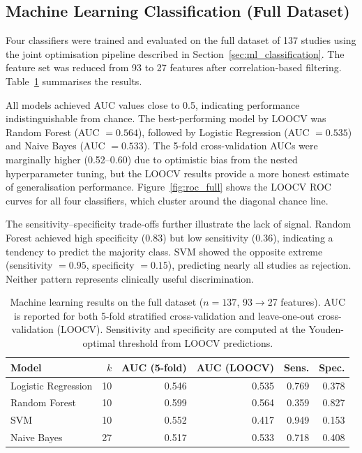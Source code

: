 \begin{appendices}
\section{Machine Learning Classification (Full Dataset)}

Four classifiers were trained and evaluated on the full dataset of 137 studies using the joint optimisation pipeline described in Section~\ref{sec:ml_classification}. The feature set was reduced from 93 to 27 features after correlation-based filtering. Table~\ref{tab:ml_full} summarises the results.

All models achieved AUC values close to 0.5, indicating performance indistinguishable from chance. The best-performing model by LOOCV was Random Forest (AUC $= 0.564$), followed by Logistic Regression (AUC $= 0.535$) and Naive Bayes (AUC $= 0.533$). The 5-fold cross-validation AUCs were marginally higher (0.52--0.60) due to optimistic bias from the nested hyperparameter tuning, but the LOOCV results provide a more honest estimate of generalisation performance. Figure~\ref{fig:roc_full} shows the LOOCV ROC curves for all four classifiers, which cluster around the diagonal chance line.

The sensitivity--specificity trade-offs further illustrate the lack of signal. Random Forest achieved high specificity (0.83) but low sensitivity (0.36), indicating a tendency to predict the majority class. SVM showed the opposite extreme (sensitivity $= 0.95$, specificity $= 0.15$), predicting nearly all studies as rejection. Neither pattern represents clinically useful discrimination.

\begin{table}[ht]
\centering
\caption{Machine learning results on the full dataset ($n = 137$, 93$\to$27 features). AUC is reported for both 5-fold stratified cross-validation and leave-one-out cross-validation (LOOCV). Sensitivity and specificity are computed at the Youden-optimal threshold from LOOCV predictions.}
\label{tab:ml_full}
\begin{tabular}{lrrrrr}
\toprule
Model & $k$ & AUC (5-fold) & AUC (LOOCV) & Sens. & Spec. \\
\midrule
Logistic Regression & 10 & 0.546 & 0.535 & 0.769 & 0.378 \\
Random Forest & 10 & 0.599 & 0.564 & 0.359 & 0.827 \\
SVM & 10 & 0.552 & 0.417 & 0.949 & 0.153 \\
Naive Bayes & 27 & 0.517 & 0.533 & 0.718 & 0.408 \\
\bottomrule
\end{tabular}
\end{table}


\end{appendices}
